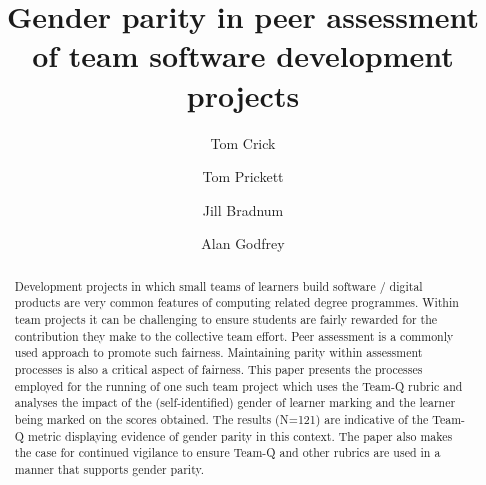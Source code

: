 \documentclass[sigconf, anonymous=true]{acmart}
\begin{document}
\title{Gender parity in peer assessment of team software development projects}

\author{Tom Crick}


\author{Tom Prickett}

\author{Jill Bradnum}

\author{Alan Godfrey}
\renewcommand{\shortauthors}{Crick et al.}

\begin{abstract}
 Development projects in which small teams of learners build software / digital products are very common features of computing related degree programmes. Within team projects it can be challenging to ensure students are fairly rewarded for the contribution they make to the collective team effort. Peer assessment is a commonly used approach to promote such fairness. Maintaining parity within assessment processes is also a critical aspect of fairness. This paper presents the processes employed for the running of one such team project which uses the Team-Q rubric and analyses the impact of the (self-identified) gender of learner marking and the learner being marked on the scores obtained. The results (N=121) are indicative of the Team-Q metric displaying evidence of gender parity in this context. The paper also makes the case for continued vigilance to ensure Team-Q and other rubrics are used in a manner that supports gender parity. 
\end{abstract}
\end{document}

